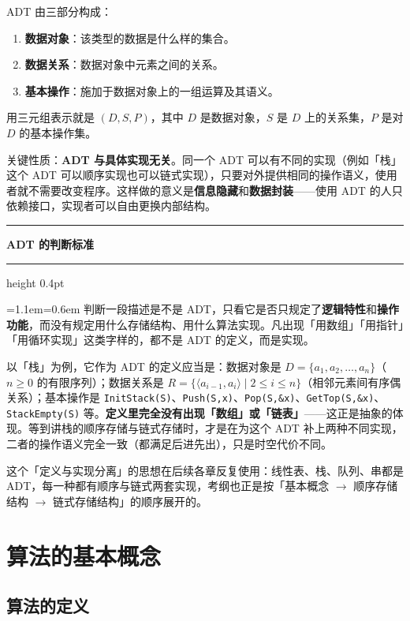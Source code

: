 \documentclass[11pt,openany,UTF8]{ctexbook}
\newcommand{\callouthead}[2]{%
  \par\addvspace{7pt}\noindent
  {\color{#1}\rule[-0.15em]{3pt}{1.05em}}\hspace{0.5em}%
  {\bfseries\color{#1}#2}\par\nobreak\vspace{-0.35em}%
  {\color{rulesep}\hrule height 0.4pt}\nobreak\vspace{0.45em}%
  \begingroup\small\setlength{\parindent}{0pt}%
  \leftskip=1.1em\rightskip=0.6em\noindent\ignorespaces}
\newcommand{\calloutend}{\par\endgroup\addvspace{7pt}}
\newenvironment{callkey}[1]{\callouthead{keybar}{#1}}{\calloutend}
\begin{document}
ADT 由三部分构成：

\begin{enumerate}
\item \textbf{数据对象}：该类型的数据是什么样的集合。
\item \textbf{数据关系}：数据对象中元素之间的关系。
\item \textbf{基本操作}：施加于数据对象上的一组运算及其语义。
\end{enumerate}
用三元组表示就是 $(D, S, P)$，其中 $D$ 是数据对象，$S$ 是 $D$ 上的关系集，$P$ 是对 $D$ 的基本操作集。

关键性质：\textbf{ADT 与具体实现无关}。同一个 ADT 可以有不同的实现（例如「栈」这个 ADT 可以顺序实现也可以链式实现），只要对外提供相同的操作语义，使用者就不需要改变程序。这样做的意义是\textbf{信息隐藏}和\textbf{数据封装}——使用 ADT 的人只依赖接口，实现者可以自由更换内部结构。

\begin{callkey}{ADT 的判断标准}
判断一段描述是不是 ADT，只看它是否只规定了\textbf{逻辑特性}和\textbf{操作功能}，而没有规定用什么存储结构、用什么算法实现。凡出现「用数组」「用指针」「用循环实现」这类字样的，都不是 ADT 的定义，而是实现。

\end{callkey}

以「栈」为例，它作为 ADT 的定义应当是：数据对象是 $D=\{a_1,a_2,\dots,a_n\}$（$n\ge 0$ 的有限序列）；数据关系是 $R=\{\langle a_{i-1},a_i\rangle \mid 2\le i\le n\}$（相邻元素间有序偶关系）；基本操作是 \texttt{InitStack(S)\allowbreak{}}、\texttt{Push(S,\allowbreak{}x)\allowbreak{}}、\texttt{Pop(S,\allowbreak{}\&x)\allowbreak{}}、\texttt{GetTop(S,\allowbreak{}\&x)\allowbreak{}}、\texttt{StackEmpty(S)\allowbreak{}} 等。\textbf{定义里完全没有出现「数组」或「链表」}——这正是抽象的体现。等到讲栈的顺序存储与链式存储时，才是在为这个 ADT 补上两种不同实现，二者的操作语义完全一致（都满足后进先出），只是时空代价不同。

这个「定义与实现分离」的思想在后续各章反复使用：线性表、栈、队列、串都是 ADT，每一种都有顺序与链式两套实现，考纲也正是按「基本概念 $\to$ 顺序存储结构 $\to$ 链式存储结构」的顺序展开的。

\section{算法的基本概念}

\subsection{算法的定义}
\end{document}
